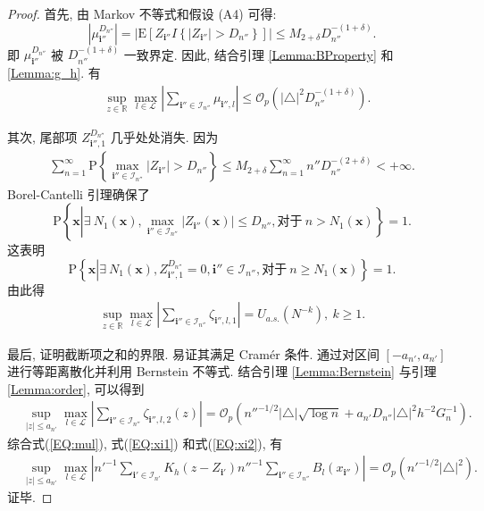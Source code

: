 \documentclass[a4paper,openay,14pt]{ctexbook}
\numberwithin{equation}{section}
\numberwithin{lem}{section}
\begin{document}
\begin{proof}
    首先, 由 Markov 不等式和假设 (A4) 可得:
    $$\left\vert \mu_{\mathbf{i}''}^{D_{n''}}\right \vert=\left \vert\mathrm{E}\left[Z_{\mathbf{i}''}I\left\{\vert Z_{\mathbf{i}''}\vert>D_{n''}\right\}\right]\right\vert \leq M_{2+\delta}D_{n''}^{-(1+\delta)}.$$
    即 $\mu_{\mathbf{i}''}^{D_{n''}}$ 被 $D_{n''}^{-(1+\delta)}$ 一致界定. 因此, 结合引理 \ref{Lemma:BProperty} 和 \ref{Lemma:g_h}. 有
    \begin{align}\label{EQ:mul}
        &\sup_{z\in\mathbb{R}}\max_{l\in\mathcal{L}}\left\vert \sum_{\mathbf{i}''\in\mathcal{I}_{n''}}\mu_{\mathbf{i}'',l}\right\vert \leq \mathcal{O}_p\left(\left \vert\triangle\right \vert^2D_{n''}^{-(1+\delta)}\right).
    \end{align}

    其次, 尾部项 $Z_{\mathbf{i}'',1}^{D_{n''}}$ 几乎处处消失. 因为
    \begin{align*}
    \sum_{n=1}^{\infty} \mathrm{P}\left\{\max_{\mathbf{i}''\in\mathcal{I}_{n''}}\vert Z_{\mathbf{i}''}\vert > D_{n''}\right\}\leq M_{2+\delta}\sum_{n=1}^{\infty}n''D_{n''}^{-(2+\delta)}<+\infty.
    \end{align*}
    Borel-Cantelli 引理确保了
    $$\mathrm{P}\left\{\boldsymbol{x}\left|\exists\: N_{1}\left(\boldsymbol{x}\right),\max\limits_{\mathbf{i}''\in\mathcal{I}_{n''}}\left|Z_{\mathbf{i}''}\left(\boldsymbol{\mathbf{x}}\right)\right|\leq D_{n''}, \text{对于}\:n>N_{1}\left(\boldsymbol{x}\right)\right\}=1.\right.$$
    这表明
    $$\mathrm{P}\left\{\boldsymbol{x}\left|\exists\:N_{1}\left(\boldsymbol{x}\right),Z_{\mathbf{i}'',1}^{D_{n''}}=0, \mathbf{i}''\in\mathcal{I}_{n''}, \text{对于} \:n\geq N_{1}\left(\boldsymbol{x}\right)\right\}=1.\right.$$
    由此得
    \begin{align}\label{EQ:xi1}
    \sup_{z\in\mathbb{R}}\max_{l\in\mathcal{L}}\left\vert\sum_{\mathbf{i}''\in\mathcal{I}_{n''}}\zeta_{\mathbf{i}'',l,1}\right\vert = U_{a.s.}\left(N^{-k}\right),~k\geq 1.
    \end{align}

    最后, 证明截断项之和的界限. 易证其满足 Cram{\'e}r 条件. 通过对区间 $[-a_{n'}, a_{n'}]$ 进行等距离散化并利用 Bernstein 不等式. 结合引理 \ref{Lemma:Bernstein} 与引理\ref{Lemma:order}, 可以得到
    \begin{align}\label{EQ:xi2}
        &\sup_{\vert z\vert\leq a_{n'}}\max_{l\in\mathcal{L}}\left\vert\sum_{\mathbf{i}''\in\mathcal{I}_{n''}}\zeta_{\mathbf{i}'',l,2}(z)\right\vert =\mathcal{O}_p\left(n''^{-1/2}\vert\triangle\vert\sqrt{\log{n}} + a_{n'}D_{n''}\vert\triangle\vert^{2}h^{-2}G_{n}^{-1}\right).
    \end{align}
    综合式(\ref{EQ:mul}), 式(\ref{EQ:xi1}) 和式(\ref{EQ:xi2}), 有
    \begin{align*}
        &\sup_{\vert z\vert\leq a_{n'}}\max_{l\in\mathcal{L}}\left\vert n'^{-1}\sum_{\mathbf{i}'\in\mathcal{I}_{n'}}K_h(z-Z_{\mathbf{i}'})n''^{-1}\sum_{\mathbf{i}''\in\mathcal{I}_{n''}}B_{l}\left(x_{\mathbf{i}''}\right)\right\vert
        = {\scriptstyle \mathcal{O}}_p\left(n'^{-1/2}\vert\triangle\vert^2\right).
    \end{align*}
    证毕.
\end{proof}
\end{document}
